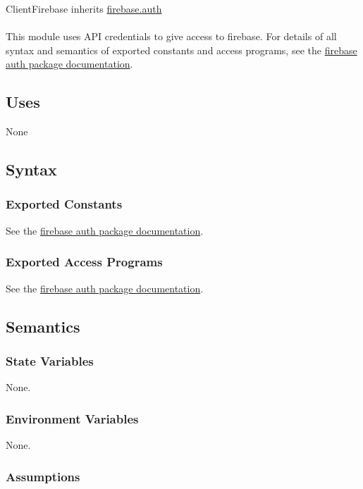 \documentclass[12pt, titlepage]{article}
\begin{document}
ClientFirebase inherits \href{https://firebase.google.com/docs/reference/js/auth}{firebase.auth} \\ \\
This module uses API credentials to give access to firebase. For details of all syntax and semantics of exported constants and access programs, see the \href{https://firebase.google.com/docs/reference/js/auth}{firebase auth package documentation}.
\subsection{Uses}

None

\subsection{Syntax}

\subsubsection{Exported Constants}

See the \href{https://firebase.google.com/docs/reference/js/auth}{firebase auth package documentation}.

\subsubsection{Exported Access Programs}

See the \href{https://firebase.google.com/docs/reference/js/auth}{firebase auth package documentation}.

\subsection{Semantics}

\subsubsection{State Variables}

None.

\subsubsection{Environment Variables}

None.

\subsubsection{Assumptions}
\end{document}

